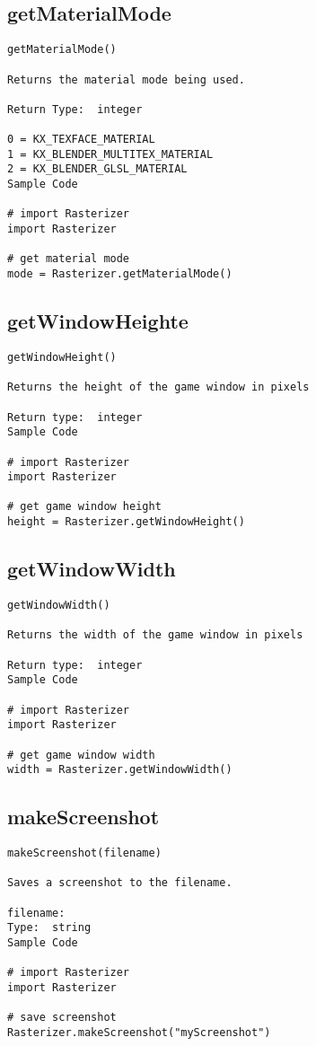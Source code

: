 \subsection{getMaterialMode}
\begin{verbatim}
getMaterialMode()

Returns the material mode being used.

Return Type:  integer

0 = KX_TEXFACE_MATERIAL
1 = KX_BLENDER_MULTITEX_MATERIAL 
2 = KX_BLENDER_GLSL_MATERIAL 
Sample Code

# import Rasterizer
import Rasterizer

# get material mode
mode = Rasterizer.getMaterialMode()
\end{verbatim}

\subsection{getWindowHeighte}
\begin{verbatim}
getWindowHeight()

Returns the height of the game window in pixels

Return type:  integer
Sample Code

# import Rasterizer
import Rasterizer

# get game window height
height = Rasterizer.getWindowHeight()
\end{verbatim}


\subsection{getWindowWidth}
\begin{verbatim}
getWindowWidth()

Returns the width of the game window in pixels

Return type:  integer
Sample Code

# import Rasterizer
import Rasterizer

# get game window width
width = Rasterizer.getWindowWidth()
\end{verbatim}


\subsection{makeScreenshot}
\begin{verbatim}
makeScreenshot(filename)

Saves a screenshot to the filename.

filename:
Type:  string
Sample Code

# import Rasterizer
import Rasterizer

# save screenshot
Rasterizer.makeScreenshot("myScreenshot")
\end{verbatim}

